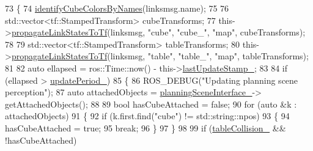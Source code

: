 \begin{DoxyCode}
73             \{
74                 \hyperlink{classsm__moveit__4_1_1cl__perception__system_1_1CpSimulatedGazeboPerception_aac02fd742b0074f62d8909ce00a02d3b}{identifyCubeColorsByNames}(linksmsg.name);
75 
76                 std::vector<tf::StampedTransform> cubeTransforms;
77                 this->\hyperlink{classsm__moveit__4_1_1cl__perception__system_1_1CpSimulatedGazeboPerception_a643fa78620216085ca385b74832a0abc}{propagateLinkStatesToTf}(linksmsg, \textcolor{stringliteral}{"cube"}, \textcolor{stringliteral}{"cube\_"}, \textcolor{stringliteral}{"map"}, 
      cubeTransforms);
78 
79                 std::vector<tf::StampedTransform> tableTransforms;
80                 this->\hyperlink{classsm__moveit__4_1_1cl__perception__system_1_1CpSimulatedGazeboPerception_a643fa78620216085ca385b74832a0abc}{propagateLinkStatesToTf}(linksmsg, \textcolor{stringliteral}{"table"}, \textcolor{stringliteral}{"table\_"}, \textcolor{stringliteral}{"map"}, 
      tableTransforms);
81 
82                 \textcolor{keyword}{auto} ellapsed = ros::Time::now() - this->\hyperlink{classsm__moveit__4_1_1cl__perception__system_1_1CpSimulatedGazeboPerception_afa9d8a4f636cf06bd7dbe49ce2ca5fa8}{lastUpdateStamp\_};
83 
84                 \textcolor{keywordflow}{if} (ellapsed > \hyperlink{classsm__moveit__4_1_1cl__perception__system_1_1CpSimulatedGazeboPerception_a185c4065558b0c320d73f366bb6b8277}{updatePeriod\_})
85                 \{
86                     ROS\_DEBUG(\textcolor{stringliteral}{"Updating planning scene perception"});
87                     \textcolor{keyword}{auto} attachedObjects = \hyperlink{classsm__moveit__4_1_1cl__perception__system_1_1CpSimulatedGazeboPerception_a34bbc7a8b23a1b1c2d3d4d30bd2fe767}{planningSceneInterface\_}->
      getAttachedObjects();
88 
89                     \textcolor{keywordtype}{bool} hasCubeAttached = \textcolor{keyword}{false};
90                     \textcolor{keywordflow}{for} (\textcolor{keyword}{auto} &k : attachedObjects)
91                     \{
92                         \textcolor{keywordflow}{if} (k.first.find(\textcolor{stringliteral}{"cube"}) != std::string::npos)
93                         \{
94                             hasCubeAttached = \textcolor{keyword}{true};
95                             \textcolor{keywordflow}{break};
96                         \}
97                     \}
98 
99                     \textcolor{keywordflow}{if} (\hyperlink{classsm__moveit__4_1_1cl__perception__system_1_1CpSimulatedGazeboPerception_a64beecc85d97c62bc4f884f4601d9c6a}{tableCollision\_} && !hasCubeAttached)

\end{DoxyCode}
